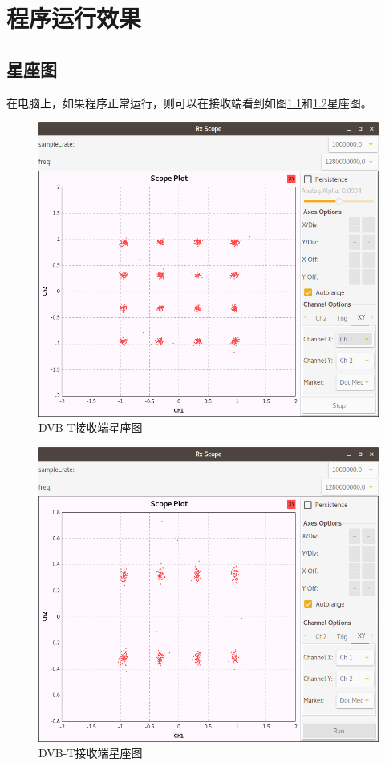 \chapter{程序运行效果}
	\section{星座图}
		\par 在电脑上，如果程序正常运行，则可以在接收端看到如图\ref{fig:dvbt_rx_map_1}和\ref{fig:dvbt_rx_map_2}星座图。
		\begin{figure}[htp]
			\centering
			\includegraphics[width=13cm]{figures/dvbt_rx_map_1.png}
			\caption{DVB-T接收端星座图}
			\label{fig:dvbt_rx_map_1}
		\end{figure}
		\begin{figure}[htp]
			\centering
			\includegraphics[width=13cm]{figures/dvbt_rx_map_2.png}
			\caption{DVB-T接收端星座图}
			\label{fig:dvbt_rx_map_2}
		\end{figure}
